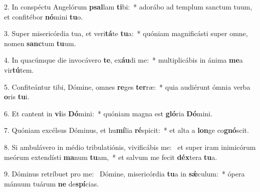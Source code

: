 2. In conspéctu Angelórum \textbf{psal}lam \textbf{ti}bi:~*  adorábo ad templum sanctum tuum, et confitébor \textbf{nó}mini \textbf{tu}o.\

3. Super misericórdia tua, et veri\textbf{tá}te \textbf{tu}a:~*  quóniam magnificásti super omne, nomen \textbf{sanc}tum \textbf{tu}um.\

4. In quacúmque die invocávero \textbf{te}, ex\textbf{áu}di me:~*  multiplicábis in ánima \textbf{me}a vir\textbf{tú}tem.\

5. Confiteántur tibi, Dómine, omnes \textbf{re}ges \textbf{ter}ræ:~*  quia audiérunt ómnia verba \textbf{o}ris \textbf{tu}i.\

6. Et cantent in \textbf{vi}is \textbf{Dó}mini:~*  quóniam magna est \textbf{gló}ria \textbf{Dó}mini.\

7. Quóniam excélsus Dóminus, et hu\textbf{mí}lia \textbf{ré}spicit:~*  et alta a \textbf{lon}ge co\textbf{gnó}scit.\

8. Si ambulávero in médio tribulatiónis, vivificábis me: \dag\  et super iram inimicórum meórum extendísti \textbf{ma}num \textbf{tu}am,~*  et salvum me fecit \textbf{déx}tera \textbf{tu}a.\

9. Dóminus retríbuet pro me: \dag\  Dómine, misericórdia \textbf{tu}a in \textbf{sǽ}culum:~*  ópera mánuum tuárum \textbf{ne} de\textbf{spí}cias.\

